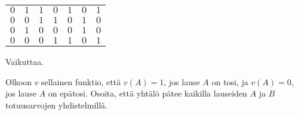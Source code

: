 \begin{tehtavasivu}
\begin{tehtava}
\begin{vastaus}
\begin{alakohdat}
{\begin{center}
\begin{tabular}{|c|c|c|c|c|c|c|}
		    $0$ & $1$ & $1$ & $0$ & $1$ & $0$ & $1$ \\
		    $0$ & $0$ & $1$ & $1$ & $0$ & $1$ & $0$ \\
		    $0$ & $1$ & $0$ & $0$ & $0$ & $1$ & $0$ \\
		    $0$ & $0$ & $0$ & $1$ & $1$ & $0$ & $1$ \\ \hline
\end{tabular}
\end{center}}
Vaikuttaa.

        \end{alakohdat}
    \end{vastaus}
    
\end{tehtava}

\begin{tehtava}
     Olkoon $v$ sellainen funktio, että $v(A) = 1$, jos lause $A$ on tosi, ja $v(A) = 0$, jos lause $A$ on epätosi. Osoita, että yhtälö pätee kaikilla lauseiden $A$ ja $B$ totuusarvojen yhdistelmillä.
    \begin{alakohdat}
    \end{alakohdat}


\end{tehtava}
\end{tehtavasivu}
